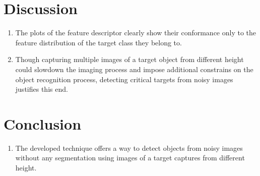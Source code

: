 \documentclass {udthesis}
\begin{document}
\section{Discussion}
\begin{enumerate}
	\item The plots of the feature descriptor clearly show their conformance only to the feature distribution of the target class they belong to.
	
	\item Though capturing multiple images of a target object from different height could slowdown the imaging process and impose additional constrains on the object recognition process, detecting critical targets from noisy images justifies this end.
\end{enumerate}

\section{Conclusion}
\begin{enumerate}
        \item The developed technique offers a way to detect objects from noisy images without any segmentation using images of a target captures from different height.
\end{enumerate}


\printglossary[type=\acronymtype]                  
\end{document}
